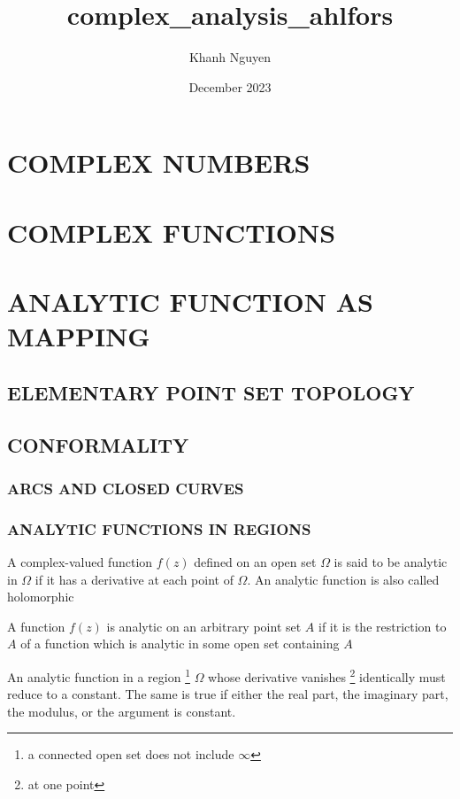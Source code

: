 \documentclass{report}
\title{complex\_analysis\_ahlfors}
\author{Khanh Nguyen}
\date{December 2023}
\begin{document}
\maketitle

\chapter{COMPLEX NUMBERS}
\chapter{COMPLEX FUNCTIONS}

\chapter{ANALYTIC FUNCTION AS MAPPING}

\section{ELEMENTARY POINT SET TOPOLOGY}

\section{CONFORMALITY}

\subsection{ARCS AND CLOSED CURVES}

\subsection{ANALYTIC FUNCTIONS IN REGIONS}

\begin{definition}
    A complex-valued function $f(z)$ defined on an open set $\Omega$ is said to be analytic in $\Omega$ if it has a derivative at each point of $\Omega$. An analytic function is also called holomorphic
\end{definition}

\begin{definition}
    A function $f(z)$ is analytic on an arbitrary point set $A$ if it is the restriction to $A$ of a function which is analytic in some open set containing $A$
\end{definition}

\begin{theorem}
    An analytic function in a region \footnote{a connected open set does not include $\infty$} $\Omega$ whose derivative vanishes \footnote{at one point} identically must reduce to a constant. The same is true if either the real part, the imaginary part, the modulus, or the argument is constant.
\end{theorem}
\end{document}
